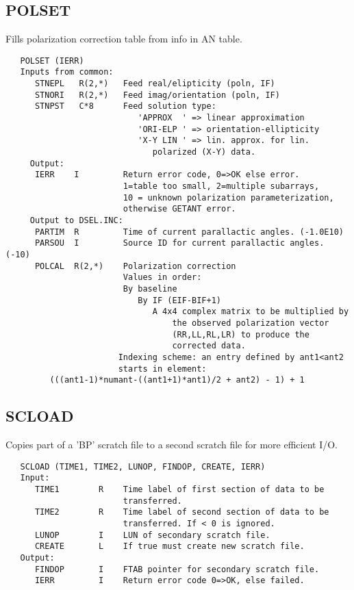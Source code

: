 \subsection{POLSET}
Fills polarization correction table from info in AN table.
\begin{verbatim}
   POLSET (IERR)
   Inputs from common:
      STNEPL   R(2,*)   Feed real/elipticity (poln, IF)
      STNORI   R(2,*)   Feed imag/orientation (poln, IF)
      STNPST   C*8      Feed solution type:
                           'APPROX  ' => linear approximation
                           'ORI-ELP ' => orientation-ellipticity
                           'X-Y LIN ' => lin. approx. for lin.
                              polarized (X-Y) data.
     Output:
      IERR    I         Return error code, 0=>OK else error.
                        1=table too small, 2=multiple subarrays,
                        10 = unknown polarization parameterization,
                        otherwise GETANT error.
     Output to DSEL.INC:
      PARTIM  R         Time of current parallactic angles. (-1.0E10)
      PARSOU  I         Source ID for current parallactic angles. (-10)
      POLCAL  R(2,*)    Polarization correction
                        Values in order:
                        By baseline
                           By IF (EIF-BIF+1)
                              A 4x4 complex matrix to be multiplied by
                                  the observed polarization vector
                                  (RR,LL,RL,LR) to produce the
                                  corrected data.
                       Indexing scheme: an entry defined by ant1<ant2
                       starts in element:
         (((ant1-1)*numant-((ant1+1)*ant1)/2 + ant2) - 1) + 1
\end{verbatim}

\subsection{SCLOAD}
Copies part of a 'BP' scratch file to a second scratch file for
more efficient I/O.
\begin{verbatim}
   SCLOAD (TIME1, TIME2, LUNOP, FINDOP, CREATE, IERR)
   Input:
      TIME1        R    Time label of first section of data to be
                        transferred.
      TIME2        R    Time label of second section of data to be
                        transferred. If < 0 is ignored.
      LUNOP        I    LUN of secondary scratch file.
      CREATE       L    If true must create new scratch file.
   Output:
      FINDOP       I    FTAB pointer for secondary scratch file.
      IERR         I    Return error code 0=>OK, else failed.
\end{verbatim}


